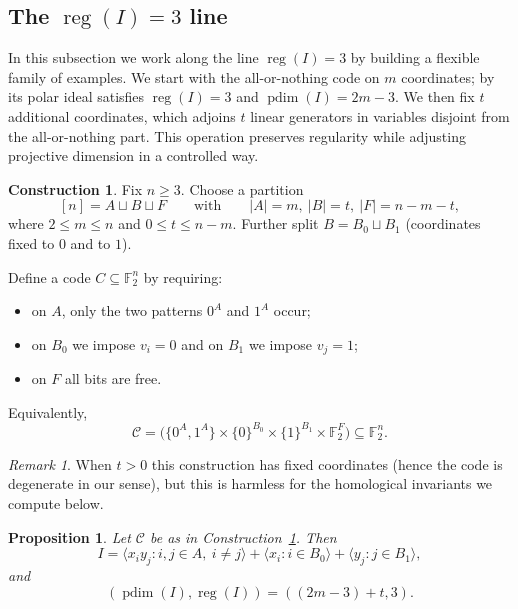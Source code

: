 \documentclass[12pt]{amsart}
\newtheorem{proposition}[theorem]{Proposition}
\theoremstyle{remark}
\newtheorem{remark}[theorem]{Remark}
\theoremstyle{definition}
\newtheorem{construction}{Construction}
\DeclareMathOperator{\reg}{reg}
\DeclareMathOperator{\pd}{pdim}
\newcommand{\F}{\mathbb{F}}
\newcommand{\C}{\mathcal{C}}
\begin{document}
\subsection{The $\reg  (I)=3$ line}\label{sec:reg3}

In this subsection we work along the line $\reg(I)=3$ by building a flexible family of examples.
We start with the all-or-nothing code on $m$ coordinates; by  its polar ideal
satisfies $\reg(I)=3$ and $\pd(I)=2m-3$.  We then fix $t$ additional coordinates, which adjoins $t$ linear
generators in variables disjoint from the all-or-nothing part.  This operation preserves regularity while
adjusting projective dimension in a controlled way.


\begin{construction}\label{const:reg3_tunable}
Fix $n\ge 3$. Choose a partition
\[
[n]=A\sqcup B\sqcup F
\qquad\text{with}\qquad
|A|=m,\ |B|=t,\ |F|=n-m-t,
\]
where $2\le m\le n$ and $0\le t\le n-m$.
Further split $B=B_0\sqcup B_1$ (coordinates fixed to $0$ and to $1$).

Define a code $C\subseteq\F_2^n$ by requiring:
\begin{itemize}
\item on $A$, only the two patterns $0^A$ and $1^A$ occur;
\item on $B_0$ we impose $v_i=0$ and on $B_1$ we impose $v_j=1$;
\item on $F$ all bits are free.
\end{itemize}
Equivalently,
\[
\C  = 
\Big(\{0^A,1^A\}\times\{0\}^{B_0}\times\{1\}^{B_1}\times \F_2^{F}\Big)
\subseteq \F_2^n.
\]
\end{construction}

\begin{remark}
 When $t>0$ this construction has fixed coordinates (hence the code is degenerate in our
sense), but this is harmless for the homological invariants we compute below.   
\end{remark} 


\begin{proposition}\label{prop:reg3_tunable_invariants}
Let $\C$ be as in Construction~\ref{const:reg3_tunable}.
Then
\[
I  = 
\big\langle x_i y_j : i,j\in A,\ i\neq j \big\rangle
 + 
\langle x_i : i\in B_0\rangle
 + 
\langle y_j : j\in B_1\rangle,
\]
and
\[
(\pd(I),\reg(I))= ((2m-3)+t,3).
\]
\end{proposition}
\end{document}
